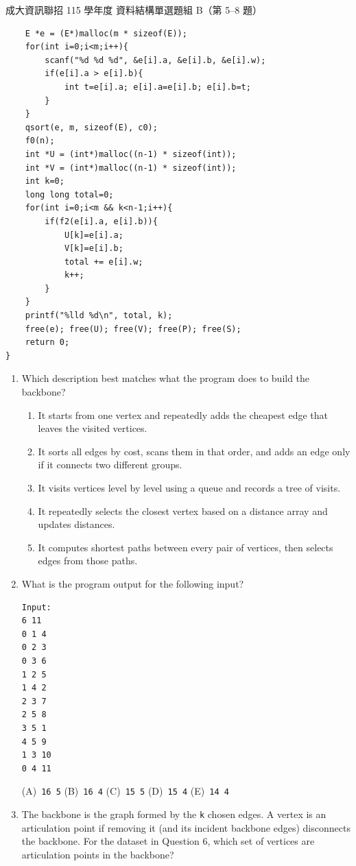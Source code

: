 \begin{pastexam}[label={px:ncku-115-prog-05}]{成大資訊聯招 115 學年度 資料結構單選題組 B（第 5--8 題）}
\begin{verbatim}
    E *e = (E*)malloc(m * sizeof(E));
    for(int i=0;i<m;i++){
        scanf("%d %d %d", &e[i].a, &e[i].b, &e[i].w);
        if(e[i].a > e[i].b){
            int t=e[i].a; e[i].a=e[i].b; e[i].b=t;
        }
    }
    qsort(e, m, sizeof(E), c0);
    f0(n);
    int *U = (int*)malloc((n-1) * sizeof(int));
    int *V = (int*)malloc((n-1) * sizeof(int));
    int k=0;
    long long total=0;
    for(int i=0;i<m && k<n-1;i++){
        if(f2(e[i].a, e[i].b)){
            U[k]=e[i].a;
            V[k]=e[i].b;
            total += e[i].w;
            k++;
        }
    }
    printf("%lld %d\n", total, k);
    free(e); free(U); free(V); free(P); free(S);
    return 0;
}
\end{verbatim}
\begin{enumerate}
\item[5.] [3\%] Which description best matches what the program does to build the backbone?
\begin{enumerate}[label=(\Alph*),nosep]
\item It starts from one vertex and repeatedly adds the cheapest edge that leaves the visited vertices.
\item It sorts all edges by cost, scans them in that order, and adds an edge only if it connects two
different groups.
\item It visits vertices level by level using a queue and records a tree of visits.
\item It repeatedly selects the closest vertex based on a distance array and updates distances.
\item It computes shortest paths between every pair of vertices, then selects edges from those paths.
\end{enumerate}

\item[6.] [3\%] What is the program output for the following input?
\begin{verbatim}
Input:
6 11
0 1 4
0 2 3
0 3 6
1 2 5
1 4 2
2 3 7
2 5 8
3 5 1
4 5 9
1 3 10
0 4 11
\end{verbatim}

(A)~\texttt{16 5} \qquad (B)~\texttt{16 4} \qquad (C)~\texttt{15 5} \qquad (D)~\texttt{15 4}
\qquad (E)~\texttt{14 4}

\item[7.] [3\%] The backbone is the graph formed by the \texttt{k} chosen edges. A vertex is an
articulation point if removing it (and its incident backbone edges) disconnects the backbone. For the
dataset in Question 6, which set of vertices are articulation points in the backbone?


\end{enumerate}
\end{pastexam}
